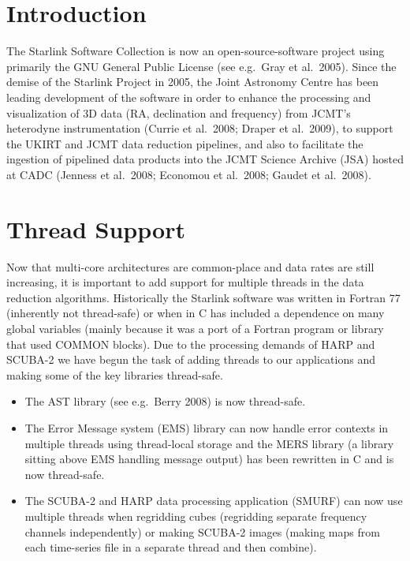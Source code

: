 \documentclass[11pt,twoside]{article}  %
\begin{document}
\section{Introduction}

The Starlink Software Collection is now an open-source-software project using primarily the GNU General Public License (see e.g.\ Gray et al.\ 2005). Since the demise of the Starlink Project in 2005, the Joint Astronomy Centre has been leading development of the software in order to enhance the processing and visualization of 3D data (RA, declination and frequency) from JCMT’s heterodyne instrumentation (Currie et al.\ 2008; Draper et al.\ 2009), to support the UKIRT and JCMT data reduction pipelines, and also to facilitate the ingestion of pipelined data products into the JCMT Science Archive (JSA) hosted at CADC (Jenness et al.\ 2008; Economou et al.\ 2008; Gaudet et al.\ 2008).


\section{Thread Support}

Now that multi-core architectures are common-place and data rates are still increasing, it is important to add support for multiple threads in the data reduction algorithms. Historically the Starlink software was written in Fortran 77 (inherently not thread-safe) or when in C has included a dependence on many global variables (mainly because it was a port of a Fortran program or library that used COMMON blocks).  Due to the processing demands of HARP and SCUBA-2 we have begun the task of adding threads to our applications and making some of the key libraries thread-safe.

\begin{itemize}
\item The AST library (see e.g.\ Berry 2008)  is now thread-safe. 
\item The Error Message system (EMS) library can now handle error contexts in multiple threads using thread-local storage and the MERS library (a library sitting above EMS handling message output) has been rewritten in C and is now thread-safe.
\item The SCUBA-2 and HARP data processing application (SMURF) can now use multiple threads when regridding cubes (regridding separate frequency channels independently) or making SCUBA-2 images (making maps from each time-series file in a separate thread and then combine).
\end{itemize}
\end{document}
